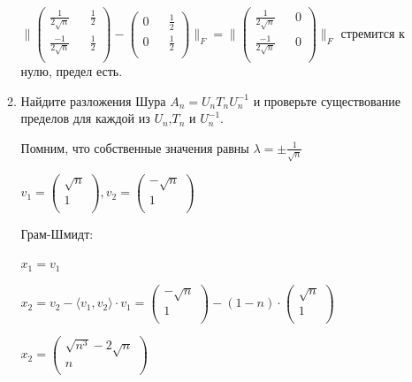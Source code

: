 \documentclass[a4paper, 11pt]{article}
\begin{document}
\begin{enumerate}
\begin{enumerate}
		$\|\begin{pmatrix}
			\frac{1}{2\sqrt{n}} && \frac{1}{2} \\
			\frac{-1}{2\sqrt{n}} && \frac{1}{2} \\
		\end{pmatrix} - \begin{pmatrix}
		0 && \frac{1}{2} \\
		0 && \frac{1}{2} \\
		\end{pmatrix}\|_F = \|\begin{pmatrix}
		\frac{1}{2\sqrt{n}} && 0 \\
		\frac{-1}{2\sqrt{n}} && 0 \\
	\end{pmatrix}\|_F$ стремится к нулю, предел есть.


			
	
			
			
			\item Найдите разложения Шура $A_n = U_n T_n U_n^{-1}$ и проверьте существование пределов для каждой из $U_n$,$T_n$ и $U_n^{-1}$.
			
				Помним, что собственные значения равны $\lambda = \pm \frac{1}{\sqrt{n}}$
				
				$v_1 = \begin{pmatrix}
					\sqrt{n} \\
					1 \\
				\end{pmatrix}, v_2 = \begin{pmatrix}
				-\sqrt{n} \\
				1 \\
			\end{pmatrix}$
		
		Грам-Шмидт:
		
		$x_1 = v_1$
		
		$x_2 = v_2 - \langle v_1, v_2 \rangle \cdot v_1 = \begin{pmatrix}
			-\sqrt{n} \\
			1 \\
		\end{pmatrix} - (1 - n) \cdot \begin{pmatrix}
			\sqrt{n} \\
			1 \\
	\end{pmatrix}$

		$x_2 = \begin{pmatrix}
			\sqrt{n^3} - 2\sqrt{n} \\
			n \\
		\end{pmatrix}$
	

\end{enumerate}
\end{enumerate}
\end{document}
